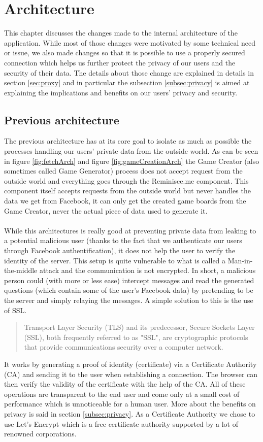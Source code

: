 \chapter{Architecture}
This chapter discusses the changes made to the internal architecture of the application. While most of those changes were motivated by some technical need or issue, we also made changes so that it is possible to use a properly secured connection which helps us further protect the privacy of our users and the security of their data. The details about those change are explained in details in section \ref{sec:proxy} and in particular the subsection \ref{subsec:privacy} is aimed at explaining the implications and benefits on our users' privacy and security.
\section{Previous architecture}
The previous architecture has at its core goal to isolate as much as possible the processes handling our users' private data from the outside world. As can be seen in figure \ref{fig:fetchArch} and figure \ref{fig:gameCreationArch} the Game Creator (also sometimes called Game Generator) process does not accept request from the outside world and everything goes through the Reminisce.me component. This component itself accepts requests from the outside world but never handles the data we get from Facebook, it can only get the created game boards from the Game Creator, never the actual piece of data used to generate it.\\\\
While this architectures is really good at preventing private data from leaking to a potential malicious user (thanks to the fact that we authenticate our users through Facebook authentification), it does not help the user to verify the identity of the server. This setup is quite vulnerable to what is called a Man-in-the-middle attack\cite{mitm} and the communication is not encrypted. In short, a malicious person could (with more or less ease) intercept messages and read the generated questions (which contain some of the user's Facebook data) by pretending to be the server and simply relaying the messages.
A simple solution to this is the use of SSL\cite{whyssl}.\blockquote{Transport Layer Security (TLS) and its predecessor, Secure Sockets Layer (SSL), both frequently referred to as "SSL", are cryptographic protocols that provide communications security over a computer network.\cite{ssl}}
It works by generating a proof of identity (certificate) via a Certificate Authority\cite{ca} (CA) and sending it to the user when establishing a connection. The browser can then verify the validity of the certificate with the help of the CA. All of these operations are transparent to the end user and come only at a small cost of performance which is unnoticeable for a human user. More about the benefits on privacy is said in section \ref{subsec:privacy}. As a Certificate Authority we chose to use Let's Encrypt\cite{letsencrypt} which is a free certificate authority supported by a lot of renowned corporations.
